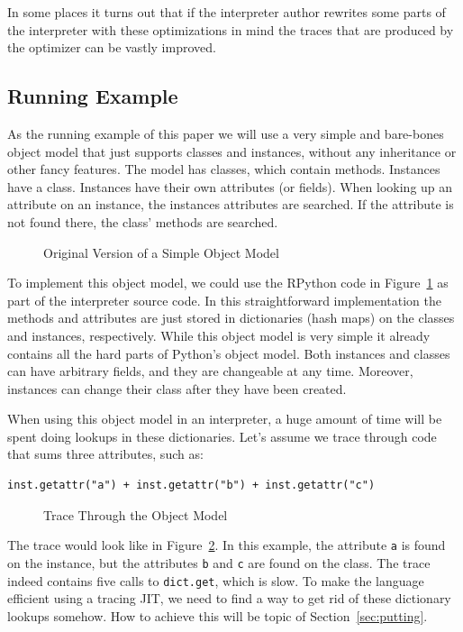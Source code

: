 \documentclass{sig-alternate}
\begin{document}
In some places it turns out that if the interpreter author rewrites some parts
of the interpreter with these optimizations in mind the traces that are produced
by the optimizer can be vastly improved.

\subsection{Running Example}
\label{sub:running}

As the running example of this paper we will use a very simple and bare-bones
object model that just supports classes and instances, without any
inheritance or other fancy features. The model has classes, which contain methods.
Instances have a class. Instances have their own attributes (or fields). When looking up an
attribute on an instance, the instances attributes are searched. If the
attribute is not found there, the class' methods are searched.

\begin{figure}

\caption{Original Version of a Simple Object Model}
\label{fig:interpreter-slow}
\end{figure}


To implement this object model, we could use the RPython code in
Figure~\ref{fig:interpreter-slow} as part of the interpreter source code.
In this straightforward implementation the methods and attributes are just
stored in dictionaries (hash maps) on the classes and instances, respectively.
While this object model is very
simple it already contains all the hard parts of Python's object model. Both
instances and classes can have arbitrary fields, and they are changeable at
any time.  Moreover, instances can change their class after they have been
created.

When using this object model in
an interpreter, a huge amount of time will be spent doing lookups in these
dictionaries.
Let's assume we trace through code that sums three attributes, such as:

\begin{Verbatim}
inst.getattr("a") + inst.getattr("b") + inst.getattr("c")
\end{Verbatim}

\begin{figure}

\caption{Trace Through the Object Model}
\label{fig:trace1}
\end{figure}

The trace would look like in Figure~\ref{fig:trace1}. In this example, the
attribute \texttt{a} is found on the instance, but the
attributes \texttt{b} and \texttt{c} are found on the class. The trace indeed contains
five calls to \texttt{dict.get}, which is slow. To make the language efficient
using a tracing JIT, we need to find a way to get rid of these dictionary
lookups somehow. How to achieve this will be topic of
Section~\ref{sec:putting}.
\end{document}
